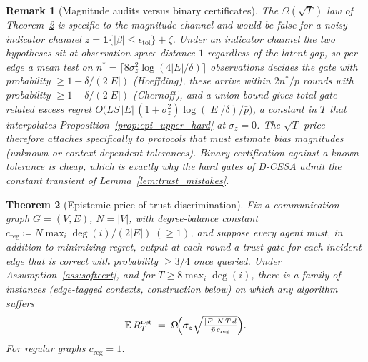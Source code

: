 \documentclass[11pt]{article}
\newtheorem{theorem}{Theorem}[section]
\newtheorem{remark}[theorem]{Remark}
\begin{document}
\begin{remark}[Magnitude audits versus binary certificates]
\label{rem:channel}
The $\Omega(\sqrt T)$ law of Theorem~\ref{thm:lower_epistemic} is
specific to the magnitude channel and would be \emph{false} for a
noisy \emph{indicator} channel
$z=\mathbf 1\{|\beta|\leq\epsilon_{\mathrm{tol}}\}+\zeta$.  Under an
indicator channel the two hypotheses sit at observation-space distance
$1$ regardless of the latent gap, so per edge a mean test on
$n^*=\lceil 8\sigma_z^2\log(4|E|/\delta)\rceil$ observations decides
the gate with probability $\geq1-\delta/(2|E|)$ (Hoeffding), these
arrive within $2n^*/\bar p$ rounds with probability
$\geq1-\delta/(2|E|)$ (Chernoff), and a union bound gives total
gate-related excess regret
$O\bigl(LS\,|E|\,(1+\sigma_z^2)\log(|E|/\delta)/\bar p\bigr)$, a
constant in $T$ that interpolates
Proposition~\ref{prop:epi_upper_hard} at $\sigma_z=0$.  The $\sqrt T$
price therefore attaches specifically to protocols that must
\emph{estimate bias magnitudes} (unknown or context-dependent
tolerances). Binary certification against a known tolerance is cheap,
which is exactly why the hard gates of D-CESA admit the constant
transient of Lemma~\ref{lem:trust_mistakes}.
\end{remark}

\begin{theorem}[Epistemic price of trust discrimination]
\label{thm:lower_epistemic}
Fix a communication graph $G=(V,E)$, $N=|V|$, with degree-balance
constant
$c_{\mathrm{reg}}\coloneqq N\max_i\deg(i)/(2|E|)\;(\geq 1)$,
and suppose every agent
must, in addition to minimizing regret, output at each round a trust
gate for each incident edge that is correct with probability
$\geq 3/4$ once queried.  Under Assumption~\ref{ass:softcert}, and for
$T\geq 8\max_i\deg(i)$, there is
a family of instances (edge-tagged contexts, construction below) on
which any algorithm suffers
\[
\mathbb E\,R_T^{\mathrm{net}}
\;=\;\Omega\!\Bigl(\sigma_z\sqrt{\tfrac{|E|\,N\,T\,d}{\bar p\,c_{\mathrm{reg}}}}\Bigr).
\]
For regular graphs $c_{\mathrm{reg}}=1$.
\end{theorem}
\end{document}
